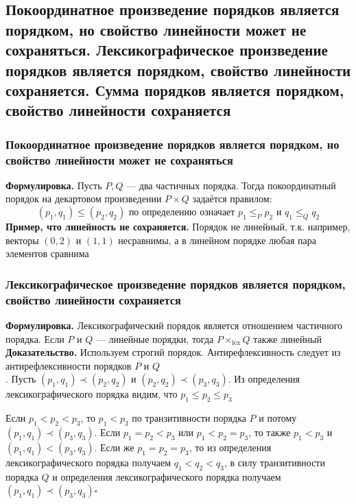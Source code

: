 \documentclass[a4paper]{article}
\newcommand{\qed}{\hfill$\square$}
\begin{document}
\subsection{Покоординатное произведение порядков является порядком, но свойство линейности может не сохраняться. Лексикографическое произведение порядков является порядком, свойство линейности сохраняется. Сумма порядков является порядком, свойство линейности сохраняется}
\subsubsection*{Покоординатное произведение порядков является порядком, но свойство линейности может не сохраняться}
\textbf{Формулировка.} Пусть $P,Q$ — два частичных порядка. Тогда покоординатный порядок на декартовом произведении $P\times Q$ задаётся правилом: 
$$(p_1,q_1)\leqslant(p_2,q_2)\textrm{ по определению означает }p_1\leqslant_P p_2\textrm{ и }q_1\leqslant_Q q_2$$
\indent\textbf{Пример, что линейность не сохраняется.} Порядок не линейный, т.к. например, векторы $(0, 2)$ и $(1, 1)$ несравнимы, а в линейном порядке любая пара элементов сравнима

\subsubsection*{Лексикографическое произведение порядков является порядком, свойство линейности сохраняется}
\textbf{Формулировка.} Лексикографический порядок является отношением частичного порядка. Если $P$ и $Q$ — линейные порядки, тогда $P\times_{\textrm{lex}}Q$ также линейный\\[2mm]
\indent\textbf{Доказательство.} Используем строгий порядок. Антирефлексивность следует из антирефлексивности порядков $P$ и $Q$\\[2mm]
. Пусть $\left(p_1, q_1\right) \prec\left(p_2, q_2\right)$ и $\left(p_2, q_2\right) \prec\left(p_3, q_3\right)$. 
Из определения лексикографического порядка видим, что $p_1 \leqslant p_2 \leqslant p_3$

Если $p_1<p_2<p_3$, то $p_1<p_3$ по транзитивности порядка 
$P$ и потому $\left(p_1, q_1\right) \prec\left(p_3, q_3\right)$. Если $p_1=p_2<p_3$ или $p_1<p_2=p_3$, то также $p_1<p_3$ и 
$\left(p_1, q_1\right)<\left(p_3, q_3\right)$. Если же $p_1=p_2=p_3$, то из определения лексикографического порядка получаем $q_1<q_2<q_3$, 
в силу транзитивности порядка $Q$ и определения лексикографического порядка получаем $\left(p_1, q_1\right) \prec\left(p_3, q_3\right)$\qed
\end{document}
